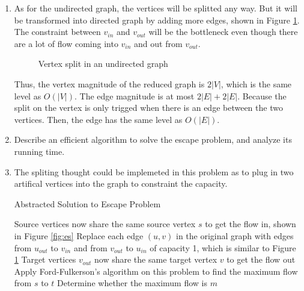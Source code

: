 \documentclass[12pt,a4paper]{article}
\makeatletter
\newtheorem*{solution}{Solution}
\theoremstyle{definition}
\renewenvironment{solution}[1][Solution] {\par\pushQED{\qed}\normalfont\topsep6\p@\@plus6\p@\relax\trivlist\item[\hskip\labelsep\bfseries#1\@addpunct{.}]\ignorespaces}{\popQED\endtrivlist\@endpefalse} \makeatother
\makeatother
\begin{document}
\begin{enumerate}
\begin{enumerate}
\begin{solution}
			As for the undirected graph, the vertices will be splitted any way. But it will be transformed into directed graph by adding more edges, shown in Figure \ref{fig:undir}. The constraint between $v_{in}$ and $v_{out}$ will be the bottleneck even though there are a lot of flow coming into $v_{in}$ and out from $v_{out}$.
			

			\begin{figure}[h]
				\centering
				
				\caption{Vertex split in an undirected graph}
				\label{fig:undir}
			\end{figure}

			Thus, the vertex magnitude of the reduced graph is $2|V|$, which is the same level as $O(|V|)$. The edge magnitude is at most $2|E|+2|E|$. Because the split on the vertex is only trigged when there is an edge between the two vertices. Then, the edge has the same level as $O(|E|)$.

		\end{solution}
        \item Describe an efficient algorithm to solve the escape problem, and analyze its running time.
        \begin{solution}
			The spliting thought could be implemeted in this problem as to plug in two artifical vertices into the graph to constraint the capacity.
			\begin{algorithm}[h]
				\caption{Abstracted Solution to Escape Problem}
				\label{alg:sep}
				Source vertices now share the same source vertex $s$ to get the flow in, shown in Figure \ref{fig:es}\;
				Replace each edge $(u,v)$ in the original graph with edges from $u_{out}$ to $v_{in}$ and from $v_{out}$ to $u_{in}$ of capacity 1, which is similar to Figure \ref{fig:undir}\;
				Target vertices $v_{out}$ now share the same target vertex $v$ to get the flow out\;
				Apply Ford-Fulkerson's algorithm on this problem to find the maximum flow from $s$ to $t$\;
				Determine whether the maximum flow is $m$\;
			\end{algorithm} 
			

\end{solution}
\end{enumerate}
\end{enumerate}
\end{document}
